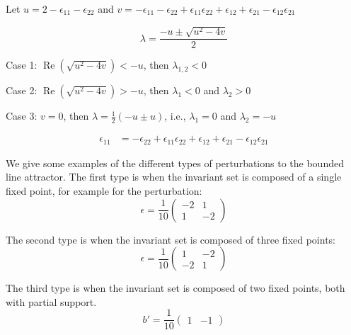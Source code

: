 \documentclass{article} %
\newcounter{ct}
\theoremstyle{definition}
\theoremstyle{remark}
\begin{document}
Let
\(u=2-\epsilon_{11}-\epsilon_{22}\)
and
\(v=-\epsilon_{11}-\epsilon_{22}+\epsilon_{11}\epsilon_{22} + \epsilon_{12} + \epsilon_{21} - \epsilon_{12}\epsilon_{21}\)

\begin{equation}
\lambda = \frac{-u \pm \sqrt{u^2-4v}}{2}
\end{equation}



Case 1: \(\operatorname{Re}(\sqrt{u^2-4v})<-u\), then
\(\lambda_{1,2}<0\)


Case 2:  \(\operatorname{Re}(\sqrt{u^2-4v})>-u\), then
\(\lambda_{1}<0\) and \(\lambda_{2}>0\)


Case 3: \(v=0\), then
\(\lambda=\tfrac{1}{2}(-u\pm u)\), i.e.,
\(\lambda_1=0\) and  \(\lambda_2=-u\)

\begin{align}
\epsilon_{11} &= -\epsilon_{22}+\epsilon_{11}\epsilon_{22} + \epsilon_{12} + \epsilon_{21} - \epsilon_{12}\epsilon_{21}
\end{align}



We give some examples of the different types of perturbations to the bounded line attractor.
The first type is when the invariant set is composed of a single fixed point, for example for the perturbation:
\begin{equation}
\epsilon = \frac{1}{10}
\begin{pmatrix}
-2  &  1 \\
 1   &  -2
\end{pmatrix}
\end{equation}



The second type is when the invariant set is composed of three fixed points:
\begin{equation}
\epsilon = \frac{1}{10}
\begin{pmatrix}
1  &  -2 \\
 -2  &  1
\end{pmatrix}
\end{equation}

The third type is when the invariant set is composed of two fixed points, both with partial support.
\begin{equation}
b' =  \frac{1}{10}
\begin{pmatrix}
1 & -1
\end{pmatrix}
\end{equation}
\end{document}
